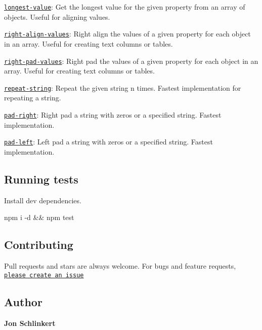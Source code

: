 \begin{DoxyItemize}
\item \href{https://github.com/jonschlinkert/longest-value}{\tt longest-\/value}\+: Get the longest value for the given property from an array of objects. Useful for aligning values.
\item \href{https://github.com/jonschlinkert/right-align-values}{\tt right-\/align-\/values}\+: Right align the values of a given property for each object in an array. Useful for creating text columns or tables.
\item \href{https://github.com/jonschlinkert/right-pad-values}{\tt right-\/pad-\/values}\+: Right pad the values of a given property for each object in an array. Useful for creating text columns or tables.
\item \href{https://github.com/jonschlinkert/repeat-string}{\tt repeat-\/string}\+: Repeat the given string n times. Fastest implementation for repeating a string.
\item \href{https://github.com/jonschlinkert/pad-right}{\tt pad-\/right}\+: Right pad a string with zeros or a specified string. Fastest implementation.
\item \href{https://github.com/jonschlinkert/pad-left}{\tt pad-\/left}\+: Left pad a string with zeros or a specified string. Fastest implementation. ~\newline
 \subsection*{Running tests}
\end{DoxyItemize}

Install dev dependencies.


\begin{DoxyCode}
npm i -d && npm test
\end{DoxyCode}


\subsection*{Contributing}

Pull requests and stars are always welcome. For bugs and feature requests, \href{https://github.com/jonschlinkert/longest/issues}{\tt please create an issue}

\subsection*{Author}

{\bfseries Jon Schlinkert}



